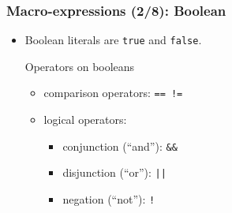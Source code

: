 \documentclass[handout,usepdftitle=false,xcolor=dvipsnames,aspectratio=169]{beamer}
\begin{document}
\begin{frame}[fragile]
  \frametitle{Macro-expressions (2/8): Boolean}
  \begin{itemize}
    \item Boolean literals are \texttt{true} and \texttt{false}.
          \begin{block}{Operators on booleans}
            \begin{itemize}
              \item comparison operators: \texttt{== !=}
              \item logical operators:
                    \begin{itemize}
                      \item conjunction (“and”): \texttt{\&\&}
                      \item disjunction (“or”): \texttt{||}
                      \item negation (“not”): \texttt{!}
                    \end{itemize}
            \end{itemize}
          \end{block}
  \end{itemize}
\end{frame}
\end{document}
